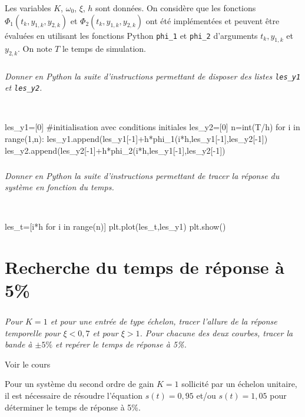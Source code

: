 \documentclass[10pt,fleqn]{article} %
\begin{document}
\vspace{0.5cm}
Les variables $K$, $\omega_0$, $\xi$, $h$ sont données. On considère que les fonctions $\Phi_1(t_k,y_{1,k},y_{2,k})$ et $\Phi_2(t_k,y_{1,k},y_{2,k})$ ont été implémentées et peuvent être évaluées en utilisant les fonctions Python \texttt{phi\_1} et \texttt{phi\_2} d'arguments $t_k, y_{1,k}$ et $y_{2,k}$. On note $T$ le temps de simulation.


\subparagraph{}
\textit{Donner en Python la suite d'instructions permettant de disposer des listes \texttt{les\_y1} et \texttt{les\_y2}.}

\ifprof
\begin{corrige}~\
\begin{python}
les_y1=[0] #initialisation avec conditions initiales
les_y2=[0]
n=int(T/h)
for i in range(1,n):
    les_y1.append(les_y1[-1]+h*phi_1(i*h,les_y1[-1],les_y2[-1])
    les_y2.append(les_y2[-1]+h*phi_2(i*h,les_y1[-1],les_y2[-1])
\end{python}
\end{corrige}
\else
\fi

\subparagraph{}
\textit{Donner en Python la suite d'instructions permettant de tracer la réponse du système en fonction du temps.}


\ifprof
\begin{corrige}~\
\begin{python}
les_t=[i*h for i in range(n)]
plt.plot(les_t,les_y1)
plt.show()
\end{python}
\end{corrige}
\else
\fi

\section{Recherche du temps de réponse à 5\%}

\subparagraph{}
\textit{Pour $K=1$ et pour une entrée de type échelon, tracer l'allure de la réponse temporelle pour $\xi<0,7$ et pour $\xi>1$. Pour chacune des deux courbes, tracer la bande à $\pm5\%$ et repérer le temps de réponse à 5\%.}

\ifprof
\begin{corrige}
Voir le cours
\end{corrige}
\else
\fi

\vspace{.5cm}

Pour un système du second ordre de gain $K=1$ sollicité par un échelon unitaire, il est nécessaire de résoudre l'équation $s(t)=0,95$ et/ou $s(t)=1,05$ pour déterminer le temps de réponse à 5\%.
\end{document}
